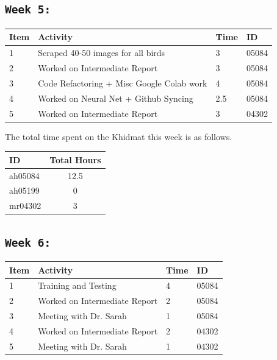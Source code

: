 \documentclass[11pt]{article}
\begin{document}
\subsection{\texttt{Week 5: }}
\begin{center}
\begin{tabular}{|l|l|l|l|}
  \hline
  \textbf{Item} 	& \textbf{Activity} & \textbf{Time} & \textbf{ID} \\\hline
    1 & Scraped 40-50 images for all birds & 3 & 05084 \\ \hline
    2 & Worked on Intermediate Report & 3 & 05084 \\ \hline
    3 & Code Refactoring + Misc Google Colab work & 4 & 05084 \\ \hline
    4 & Worked on Neural Net + Github Syncing & 2.5 & 05084 \\ \hline
    5 & Worked on Intermediate Report & 3 & 04302 \\ \hline
\end{tabular}
    
\end{center}
The total time spent on the Khidmat this week is as follows.    
\begin{center}
\begin{tabular}{|l|c|}
  \hline
  \textbf{ID} & \textbf{Total Hours}\\\hline
  ah05084 & 12.5 \\\hline
  ah05199 & 0 \\\hline
  mr04302 & 3 \\\hline
\end{tabular}
\end{center}
\newpage

\subsection{\texttt{Week 6: }}
\begin{center}
\begin{tabular}{|l|l|l|l|}
  \hline
  \textbf{Item} 	& \textbf{Activity} & \textbf{Time} & \textbf{ID} \\\hline
  1 & Training and Testing & 4 & 05084  \\ \hline
  2 & Worked on Intermediate Report & 2 & 05084 \\ \hline
  3 & Meeting with Dr. Sarah & 1 & 05084 \\ \hline
  4 & Worked on Intermediate Report & 2 & 04302 \\ \hline
  5 & Meeting with Dr. Sarah & 1 & 04302 \\ \hline
  
\end{tabular}
    
\end{center}
\end{document}
